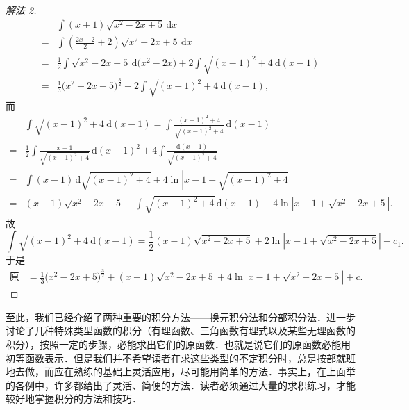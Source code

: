 \begin{proof}[解法 2]
\[
\begin{aligned}
&\int(x+1)\sqrt{x^{2}-2x+5}\,\mathrm{d}x\\
={}& \int\left(\frac{2x-2}{2}+2\right)\sqrt{x^{2}-2x+5}\,\mathrm{d}x\\
={}& \frac{1}{2}\int\sqrt{x^{2}-2x+5}\,\mathrm{d}\big(x^{2}-2x\big)
+2\int\sqrt{(x-1)^{2}+4}\,\mathrm{d}(x-1)\\
={}& \frac{1}{3}\big(x^{2}-2x+5\big)^{\frac{3}{2}}
+2\int\sqrt{(x-1)^{2}+4}\,\mathrm{d}(x-1),
\end{aligned}
\]
而
\[
\begin{aligned}
&\int\sqrt{(x-1)^{2}+4}\,\mathrm{d}(x-1)
= \int\frac{(x-1)^{2}+4}{\sqrt{(x-1)^{2}+4}}\,\mathrm{d}(x-1)\\
={}& \frac{1}{2}\int\frac{x-1}{\sqrt{(x-1)^{2}+4}}\,\mathrm{d}(x-1)^{2}
+4\int\frac{\mathrm{d}(x-1)}{\sqrt{(x-1)^{2}+4}}\\
={}& \int(x-1)\,\mathrm{d}\sqrt{(x-1)^{2}+4}
+4\ln\left|x-1+\sqrt{(x-1)^{2}+4}\right|\\
={}& (x-1)\sqrt{x^{2}-2x+5}-\int\sqrt{(x-1)^{2}+4}\,\mathrm{d}(x-1)
+4\ln\left|x-1+\sqrt{x^{2}-2x+5}\right|.
\end{aligned}
\]
故
\[
\int\sqrt{(x-1)^{2}+4}\,\mathrm{d}(x-1)
= \frac{1}{2}(x-1)\sqrt{x^{2}-2x+5}
+2\ln\left|x-1+\sqrt{x^{2}-2x+5}\right|+c_{1}.
\]
于是
\[
\begin{aligned}
\text{原式} &= \frac{1}{3}\big(x^{2}-2x+5\big)^{\frac{3}{2}}
+(x-1)\sqrt{x^{2}-2x+5}
+4\ln\left|x-1+\sqrt{x^{2}-2x+5}\right|+c.
\end{aligned}
\]
\end{proof}

至此，我们已经介绍了两种重要的积分方法——换元积分法和分部积分法．进一步讨论了几种特殊类型函数的积分（有理函数、三角函数有理式以及某些无理函数的积分），按照一定的步骤，必能求出它们的原函数．也就是说它们的原函数必能用初等函数表示．但是我们并不希望读者在求这些类型的不定积分时，总是按部就班地去做，而应在熟练的基础上灵活应用，尽可能用简单的方法．事实上，在上面举的各例中，许多都给出了灵活、简便的方法．读者必须通过大量的求积练习，才能较好地掌握积分的方法和技巧．

